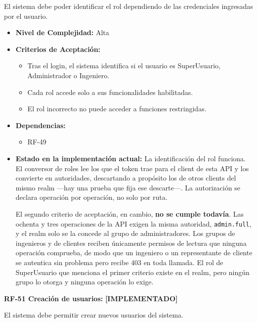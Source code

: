 \documentclass[12pt,a4paper]{article}
\newcommand{\estadoImplementado}{\textcolor{mainRed}{\textbf{[IMPLEMENTADO]}}}
\begin{document}
El sistema debe poder identificar el rol dependiendo de las credenciales ingresadas por el usuario.

\begin{itemize}
  \item \textbf{Nivel de Complejidad:} Alta

  \item \textbf{Criterios de Aceptación:}
  \begin{itemize}
    \item Tras el login, el sistema identifica si el usuario es SuperUsuario, Administrador o Ingeniero.
    \item Cada rol accede solo a sus funcionalidades habilitadas.
    \item El rol incorrecto no puede acceder a funciones restringidas.
  \end{itemize}

  \item \textbf{Dependencias:}
  \begin{itemize}
    \item RF-49
  \end{itemize}

  \item \textbf{Estado en la implementación actual:} La identificación del rol funciona. El conversor de roles lee los que el token trae para el client de esta API y los convierte en autoridades, descartando a propósito los de otros clients del mismo realm —hay una prueba que fija ese descarte—. La autorización se declara operación por operación, no solo por ruta.

  El segundo criterio de aceptación, en cambio, \textbf{no se cumple todavía}. Las ochenta y tres operaciones de la API exigen la misma autoridad, \texttt{admin.full}, y el realm solo se la concede al grupo de administradores. Los grupos de ingenieros y de clientes reciben únicamente permisos de lectura que ninguna operación comprueba, de modo que un ingeniero o un representante de cliente se autentica sin problema pero recibe 403 en toda llamada. El rol de SuperUsuario que menciona el primer criterio existe en el realm, pero ningún grupo lo otorga y ninguna operación lo exige.
\end{itemize}

\textbf{RF-51 Creación de usuarios:} \estadoImplementado{}

El sistema debe permitir crear nuevos usuarios del sistema.
\end{document}
